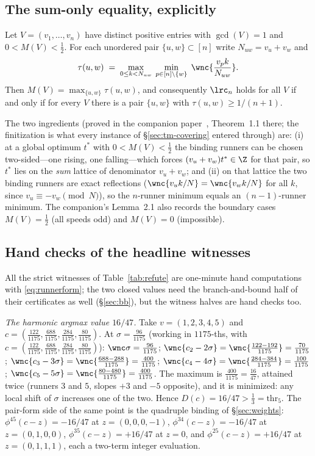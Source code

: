 \subsection{The sum-only equality, explicitly}

\begin{theorem}\label{thm:equality-explicit}
Let $V=(v_1,\dots,v_n)$ have distinct positive entries with $\gcd(V)=1$
and $0<M(V)<\tfrac12$. For each unordered pair $\{u,w\}\subset[n]$ write
$N_{uw}=v_u+v_w$ and
\[
\tau(u,w)\;=\;\max_{0\le k<N_{uw}}\;\min_{p\in[n]\setminus\{w\}}\;
\wnc{\frac{v_pk}{N_{uw}}}.
\]
Then $M(V)=\max_{\{u,w\}}\tau(u,w)$, and consequently $\lrc_n$ holds
for all $V$ if and only if for every $V$ there is a pair $\{u,w\}$ with
$\tau(u,w)\ge 1/(n+1)$.
\end{theorem}

The two ingredients (proved in the companion paper~\cite{companion-monograph}, Theorem~1.1
there; the finitization is what every instance of \S\ref{sec:tm-covering}
entered through) are: (i) at a global optimum $t^\ast$ with
$0<M(V)<\tfrac12$ the binding runners can be chosen two-sided---one
rising, one falling---which forces $(v_u+v_w)t^\ast\in\Z$ for that pair,
so $t^\ast$ lies on the \emph{sum} lattice of denominator $v_u+v_w$; and
(ii) on that lattice the two binding runners are exact reflections
($\wnc{v_uk/N}=\wnc{v_wk/N}$ for all $k$, since $v_u\equiv-v_w \pmod N$),
so the $n$-runner minimum equals an $(n-1)$-runner minimum. The
companion's Lemma~2.1 also records the boundary cases $M(V)=\tfrac12$
(all speeds odd) and $M(V)=0$ (impossible).

\subsection{Hand checks of the headline witnesses}

All the strict witnesses of Table~\ref{tab:refute} are one-minute hand
computations with \eqref{eq:runnerform}; the two closed values need the
branch-and-bound half of their certificates as well
(\S\ref{sec:bb}), but the witness halves are hand checks too.

\emph{The harmonic argmax value $16/47$.} Take $v=(1,2,3,4,5)$ and
$c=(\tfrac{122}{1175},\tfrac{688}{1175},\tfrac{284}{1175},
\tfrac{80}{1175})$. At $\sigma=\tfrac{96}{1175}$ (working in
$1175$-ths, with $c=(\tfrac{122}{1175},\tfrac{688}{1175},
\tfrac{284}{1175},\tfrac{80}{1175})$):
$\wnc\sigma=\tfrac{96}{1175}$;
$\wnc{c_2-2\sigma}=\wnc{\tfrac{122-192}{1175}}=\tfrac{70}{1175}$;
$\wnc{c_3-3\sigma}=\wnc{\tfrac{688-288}{1175}}=\tfrac{400}{1175}$;
$\wnc{c_4-4\sigma}=\wnc{\tfrac{284-384}{1175}}=\tfrac{100}{1175}$;
$\wnc{c_5-5\sigma}=\wnc{\tfrac{80-480}{1175}}=\tfrac{400}{1175}$.
The maximum is $\tfrac{400}{1175}=\tfrac{16}{47}$, attained twice
(runners $3$ and $5$, slopes $+3$ and $-5$ opposite), and it is
minimized: any local shift of $\sigma$ increases one of the two. Hence
$D(c)=16/47>\tfrac13=\mathrm{thr}_5$. The pair-form side of the same
point is the quadruple binding of \S\ref{sec:weights}:
$\phi^{45}(c-z)=-16/47$ at $z=(0,0,0,-1)$, $\phi^{34}(c-z)=-16/47$ at
$z=(0,1,0,0)$, $\phi^{35}(c-z)=+16/47$ at $z=0$, and
$\phi^{25}(c-z)=+16/47$ at $z=(0,1,1,1)$, each a two-term integer
evaluation.

